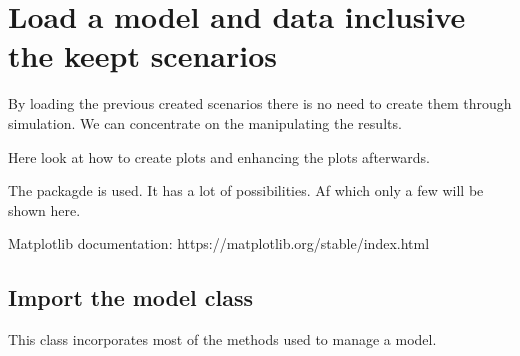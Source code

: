 \documentclass[letterpaper,10pt,english]{jupyterBook}
\begin{document}
\chapter{Load a model and data inclusive the keept scenarios}
\label{\detokenize{content/howto/keep/Create and modify charts with keep_plot:load-a-model-and-data-inclusive-the-keept-scenarios}}\label{\detokenize{content/howto/keep/Create and modify charts with keep_plot::doc}}
\sphinxAtStartPar
By loading the previous created scenarios there is no need to create them through simulation. We can concentrate on the
manipulating the results.

\sphinxAtStartPar
Here look at how to create plots and enhancing the plots afterwards.

\sphinxAtStartPar
The  packagde is used. It has a lot of possibilities. Af which only a few will be shown here.

\sphinxAtStartPar
Matplotlib documentation: https://matplotlib.org/stable/index.html


\section{Import the model class}
\label{\detokenize{content/howto/keep/Create and modify charts with keep_plot:import-the-model-class}}
\sphinxAtStartPar
This class incorporates most of the methods used to manage a model.
\end{document}
